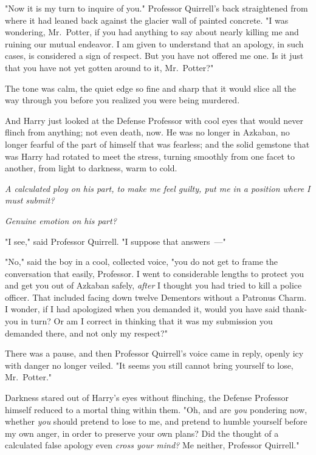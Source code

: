 "Now it is my turn to inquire of you." Professor Quirrell's back straightened
from where it had leaned back against the glacier wall of painted concrete. "I
was wondering, Mr.~Potter, if you had anything to say about nearly killing me
and ruining our mutual endeavor. I am given to understand that an apology, in
such cases, is considered a sign of respect. But you have not offered me one.
Is it just that you have not yet gotten around to it, Mr.~Potter?"

The tone was calm, the quiet edge so fine and sharp that it would slice all the
way through you before you realized you were being murdered.

And Harry just looked at the Defense Professor with cool eyes that would never
flinch from anything; not even death, now. He was no longer in Azkaban, no
longer fearful of the part of himself that was fearless; and the solid gemstone
that was Harry had rotated to meet the stress, turning smoothly from one facet
to another, from light to darkness, warm to cold.

\emph{A calculated ploy on his part, to make me feel guilty, put me in a
position where I must submit?}

\emph{Genuine emotion on his part?}

"I see," said Professor Quirrell. "I suppose that answers~---"

"No," said the boy in a cool, collected voice, "you do not get to frame the
conversation that easily, Professor. I went to considerable lengths to protect
you and get you out of Azkaban safely, \emph{after} I thought you had tried to
kill a police officer. That included facing down twelve Dementors without a
Patronus Charm. I wonder, if I had apologized when you demanded it, would you
have said thank-you in turn? Or am I correct in thinking that it was my
submission you demanded there, and not only my respect?"

There was a pause, and then Professor Quirrell's voice came in reply, openly
icy with danger no longer veiled. "It seems you still cannot bring yourself to
lose, Mr.~Potter."

Darkness stared out of Harry's eyes without flinching, the Defense Professor
himself reduced to a mortal thing within them. "Oh, and are \emph{you}
pondering now, whether \emph{you} should pretend to lose to me, and pretend to
humble yourself before my own anger, in order to preserve your own plans? Did
the thought of a calculated false apology even \emph{cross your mind?} Me
neither, Professor Quirrell."

